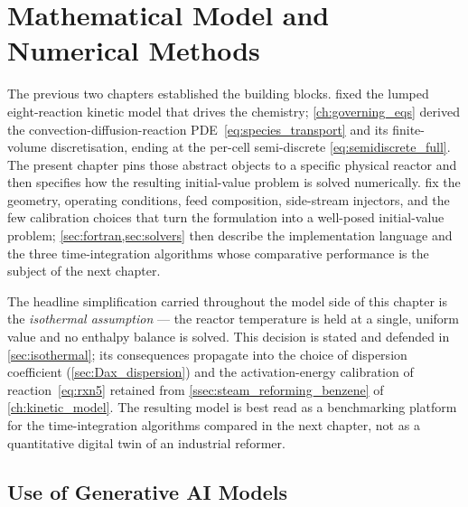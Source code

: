 
\chapter{Mathematical Model and Numerical Methods}\label{ch:reactor_model}

The previous two chapters established the building blocks.  fixed the lumped eight-reaction kinetic model that drives the chemistry; \cref{ch:governing_eqs} derived the convection-diffusion-reaction PDE~\eqref{eq:species_transport} and its finite-volume discretisation, ending at the per-cell semi-discrete \cref{eq:semidiscrete_full}. The present chapter pins those abstract objects to a specific physical reactor and then specifies how the resulting initial-value problem is solved numerically.  fix the geometry, operating conditions, feed composition, side-stream injectors, and the few calibration choices that turn the formulation into a well-posed initial-value problem; \cref{sec:fortran,sec:solvers} then describe the implementation language and the three time-integration algorithms whose comparative performance is the subject of the next chapter.

The headline simplification carried throughout the model side of this chapter is the \emph{isothermal assumption} --- the reactor temperature is held at a single, uniform value and no enthalpy balance is solved. This decision is stated and defended in \cref{sec:isothermal}; its consequences propagate into the choice of dispersion coefficient (\cref{sec:Dax_dispersion}) and the activation-energy calibration of reaction~\eqref{eq:rxn5} retained from \cref{ssec:steam_reforming_benzene} of \cref{ch:kinetic_model}. The resulting model is best read as a benchmarking platform for the time-integration algorithms compared in the next chapter, not as a quantitative digital twin of an industrial reformer.


\section*{Use of Generative AI Models}\label{sec:ai_use}


